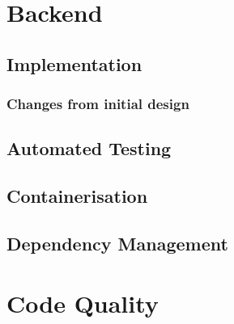 \section{Backend}
\subsection{Implementation}
\subsubsection{Changes from initial design}
\subsection{Automated Testing}
\subsection{Containerisation}
\subsection{Dependency Management}

\section{Code Quality} \label{sec:code-quality}
